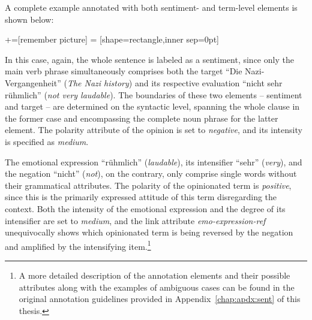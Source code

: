 A complete example annotated with both sentiment- and term-level
elements is shown below:
\begin{example}\label{snt:exmp:sent-anno2}
  +=[remember picture]
   = [shape=rectangle,inner sep=0pt]
  \upshape{}\\[2.2em]
  \noindent{}

\end{example}
In this case, again, the whole sentence is labeled as a sentiment,
since only the main verb phrase simultaneously comprises both the
target ``Die Nazi-Vergangenheit'' (\emph{The Nazi history}) and its
respective evaluation ``nicht sehr r\"uhmlich'' (\emph{not very
  laudable}).  The boundaries of these two elements -- sentiment and
target -- are determined on the syntactic level, spanning the whole
clause in the former case and encompassing the complete noun phrase
for the latter element.  The polarity attribute of the opinion is set
to \emph{negative}, and its intensity is specified as \emph{medium}.

The emotional expression ``r\"uhmlich'' (\emph{laudable}), its
intensifier ``sehr'' (\emph{very}), and the negation ``nicht''
(\emph{not}), on the contrary, only comprise single words without
their grammatical attributes.  The polarity of the opinionated term is
\emph{positive}, since this is the primarily expressed attitude of
this term disregarding the context.  Both the intensity of the
emotional expression and the degree of its intensifier are set to
\emph{medium}, and the link attribute \emph{emo-expression-ref}
unequivocally shows which opinionated term is being reversed by the
negation and amplified by the intensifying item.\footnote{A more
  detailed description of the annotation elements and their possible
  attributes along with the examples of ambiguous cases can be found
  in the original annotation guidelines provided in
  Appendix~\ref{chap:apdx:sent} of this thesis.}

